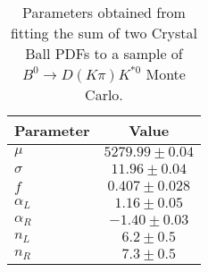 \begin{table}[h]
  \centering
  \begin{tabular}{lc}
      \toprule
      Parameter & Value \\
      \midrule
      $\mu$ & $5279.99 \pm 0.04$ \\
      $\sigma$ & $11.96 \pm 0.04$ \\
      $f$ & $0.407 \pm 0.028$ \\
      $\alpha_L$ & $1.16 \pm 0.05$ \\
      $\alpha_R$ & $-1.40 \pm 0.03$ \\
      $n_L$ & $6.2 \pm 0.5$ \\
      $n_R$ & $7.3 \pm 0.5$ \\
  \bottomrule
  \end{tabular}
  \caption{Parameters obtained from fitting the sum of two Crystal Ball PDFs to a sample of $B^0 \to D(K\pi)K^{*0}$ Monte Carlo.}
\label{tab:signal_Kpi_MC_params}
\end{table}
